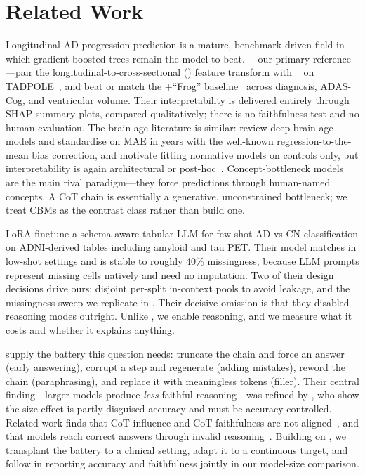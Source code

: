 \section{Related Work}
\label{sec:related}

 Longitudinal AD progression
prediction is a mature, benchmark-driven field in which gradient-boosted trees remain the model to
beat. \citet{ding2025l2ctabpfn}---our primary reference---pair the longitudinal-to-cross-sectional
(\ltoc) feature transform with \tabpfn~\citep{hollmann2023tabpfn} on TADPOLE~\citep{marinescu2020tadpole},
and beat or match the \ltoc$+$\xgb ``Frog'' baseline~\citep{chen2016xgboost} across diagnosis,
ADAS-Cog, and ventricular volume. Their interpretability is delivered entirely through SHAP summary
plots, compared qualitatively; there is no faithfulness test and no human evaluation. The brain-age
literature is similar: \citet{more2023brainage} review deep brain-age models and standardise on MAE
in years with the well-known regression-to-the-mean bias correction, and \citet{lee2021disentangling}
motivate fitting normative models on controls only, but interpretability is again architectural or
post-hoc~\citep{sihag2023vnn,nakamura2025openmap}. Concept-bottleneck
models~\citep{zarlenga2022cem,kim2024clinicalcbm} are the main rival paradigm---they force
predictions through human-named concepts. A CoT chain is essentially a generative, unconstrained
bottleneck; we treat CBMs as the contrast class rather than build one.

 \citet{kearney2026tapgpt} LoRA-finetune a
schema-aware tabular LLM for few-shot AD-vs-CN classification on ADNI-derived tables including
amyloid and tau PET. Their model matches \tabpfn in low-shot settings and is stable to roughly 40\%
missingness, because LLM prompts represent missing cells natively and need no imputation. Two of
their design decisions drive ours: disjoint per-split in-context pools to avoid leakage, and the
missingness sweep we replicate in . Their decisive omission is that they
disabled reasoning modes outright. Unlike \citet{kearney2026tapgpt}, we enable reasoning, and we
measure what it costs and whether it explains anything.

 \citet{lanham2023faithfulness} supply the battery this
question needs: truncate the chain and force an answer (early answering), corrupt a step and
regenerate (adding mistakes), reword the chain (paraphrasing), and replace it with meaningless
tokens (filler). Their central finding---larger models produce \emph{less} faithful
reasoning---was refined by \citet{bentham2024disguised}, who show the size effect is partly
disguised accuracy and must be accuracy-controlled. Related work finds that CoT influence and CoT
faithfulness are not aligned~\citep{parcalabescu2025influence}, and that models reach correct
answers through invalid reasoning~\citep{bao2024invalid}. Building on
\citet{lanham2023faithfulness}, we transplant the battery to a clinical setting, adapt it to a
continuous target, and follow \citet{bentham2024disguised} in reporting accuracy and faithfulness
jointly in our model-size comparison.


